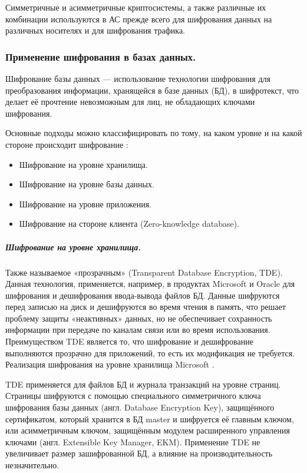 Симметричные и асимметричные криптосистемы, а также различные их комбинации используются в АС
прежде всего для шифрования данных на различных носителях и для шифрования трафика.


\subsubsection{Применение шифрования в базах данных.}

Шифрование базы данных — использование технологии шифрования для преобразования информации,
хранящейся в базе данных (БД), в шифротекст, что делает её прочтение невозможным для лиц, не
обладающих ключами шифрования.

Основные подходы можно классифицировать по тому, на каком уровне и на какой стороне происходит шифрование \cite{DB-ENC}:
\begin{itemize}
    \item Шифрование на уровне хранилища.
    \item Шифрование на уровне базы данных.
    \item Шифрование на уровне приложения.
    \item Шифрование на стороне клиента (Zero-knowledge database).
\end{itemize}

\subparagraph{Шифрование на уровне хранилища.}
Также называемое «прозрачным» (Transparent Database Encryption, TDE). Данная технология,
применяется, например, в продуктах Microsoft и Oracle для шифрования и дешифрования ввода-вывода
файлов БД. Данные шифруются перед записью на диск и дешифруются во время чтения в память, что
решает проблему защиты «неактивных» данных, но не обеспечивает сохранность информации при передаче
по каналам связи или во время использования. Преимуществом TDE является то, что шифрование и
дешифрование выполняются прозрачно для приложений, то есть их модификация не требуется. \\

Реализация шифрования на уровне хранилища Microsoft \cite{Microsoft-TDE}.

TDE применяется для файлов БД и журнала транзакций на уровне страниц. Страницы шифруются с помощью
специального симметричного ключа шифрования базы данных (англ. Database Encryption Key),
защищённого сертификатом, который хранится в БД master и шифруется её главным ключом, или
асимметричным ключом, защищённым модулем расширенного управления ключами (англ. Extensible Key
Manager, EKM). Применение TDE не увеличивает размер зашифрованной БД, а влияние на
производительность незначительно. \\

